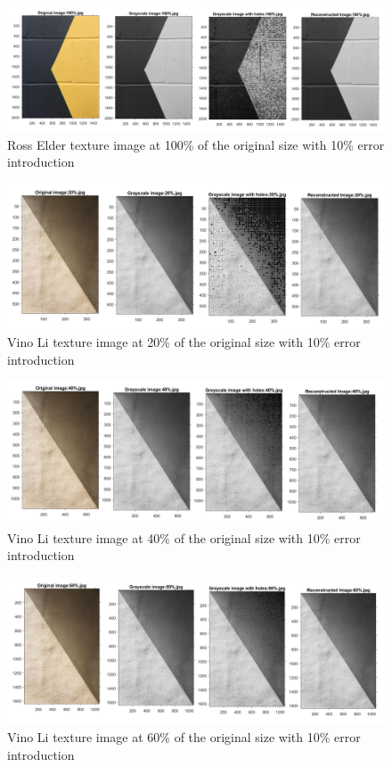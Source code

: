 \begin{figure}[!ht]
\center \includegraphics[scale=0.31]{RossElder100.jpg}
\caption{Ross Elder texture image at 100\% of the original size with 10\% error introduction}
\label{fig:RossElder100}
\end{figure}


\begin{figure}[!ht]
\center \includegraphics[scale=0.31]{VinoLi20.jpg}
\caption{Vino Li texture image at 20\% of the original size with 10\% error introduction}
\label{fig:VinoLi20}
\end{figure}

\begin{figure}[!ht]
\center \includegraphics[scale=0.31]{VinoLi40.jpg}
\caption{Vino Li texture image at 40\% of the original size with 10\% error introduction}
\label{fig:VinoLi40}
\end{figure}

\begin{figure}[!ht]
\center \includegraphics[scale=0.31]{VinoLi60.jpg}
\caption{Vino Li texture image at 60\% of the original size with 10\% error introduction}
\label{fig:VinoLi60}
\end{figure}

